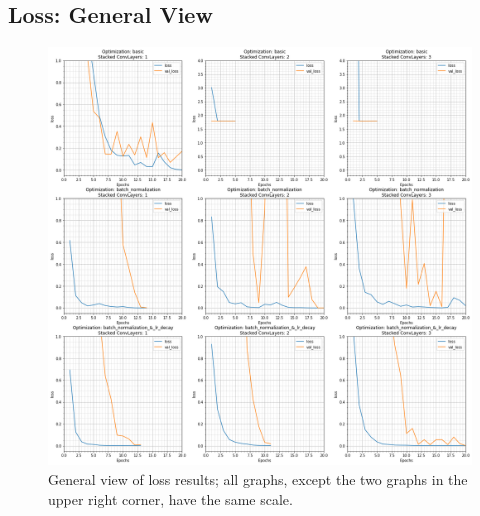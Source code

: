 \documentclass{article}
\begin{document}
\subsection{Loss: General View}
\begin{figure}[h]
    \centering
    \centerline{
        \includegraphics[width=0.63\paperwidth]{loss_general}
    }
    \caption{General view of loss results; all graphs, except the two graphs in the upper right corner, have the same scale.}
    \label{fig:loss_general}
\end{figure}


\newpage
\end{document}
